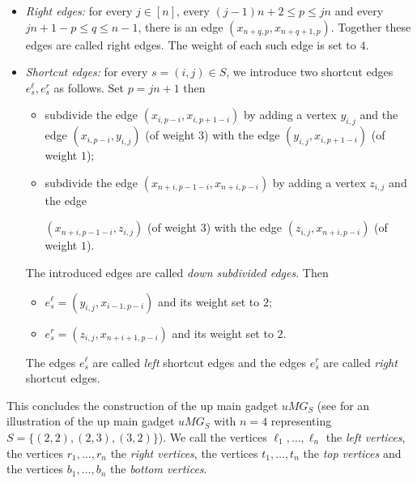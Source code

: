 \documentclass[a4paper,11pt]{article}
\theoremstyle{plain}
\newtheorem{identification rule}{Identification Rule}
\theoremstyle{definition}
\theoremstyle{remark}
\begin{document}
\begin{itemize}
\item \emph{Right edges:} for every $j \in [n]$, every $(j-1)n+2 \leq p \leq jn$ and every $jn+1-p \leq q \leq n-1$, there is an edge $(x_{n+q,p},x_{n+q+1,p})$. Together these edges are called right edges. The weight of each such edge is set to $4$.
\item \emph{Shortcut edges:} for every $s=(i,j) \in S$, we introduce two shortcut edges $e^\ell_s,e^r_s$ as follows. Set $p = jn+1$ then
\begin{itemize}
\item subdivide the edge $(x_{i,p-i},x_{i,p+1-i})$ by adding a vertex $y_{i,j}$ and the edge $(x_{i,p-i},y_{i,j})$ (of weight $3$) with the edge $(y_{i,j},x_{i,p+1-i})$ (of weight $1$);
\item subdivide the edge $(x_{n+i,p-1-i},x_{n+i,p-i})$ by adding a vertex $z_{i,j}$ and the edge 

$(x_{n+i,p-1-i},z_{i,j})$ (of weight $3$) with the edge $(z_{i,j},x_{n+i,p-i})$ (of weight $1$). 
\end{itemize}
The introduced edges are called \emph{down subdivided edges}. Then
\begin{itemize}
\item $e^\ell_s= (y_{i,j},x_{i-1,p-i})$ and its weight set to $2$;
\item $e^r_s = (z_{i,j},x_{n+i+1,p-i})$ and its weight set to $2$.
\end{itemize}
The edges $e^\ell_s$ are called \emph{left} shortcut edges and the edges $e^r_s$ are called \emph{right} shortcut edges.  
\end{itemize}
This concludes the construction of the up main gadget $uMG_S$ (see  for an illustration of the up main gadget $uMG_S$ with $n=4$ representing $S= \{(2,2),(2,3),(3,2)\}$). We call the vertices $\ell_1,\ldots,\ell_n$ the \emph{left vertices}, the vertices $r_1,\ldots,r_n$ the \emph{right vertices}, the vertices $t_1,\ldots,t_n$ the \emph{top vertices} and the vertices $b_1,\ldots,b_n$ the \emph{bottom vertices}.\\
\end{document}
